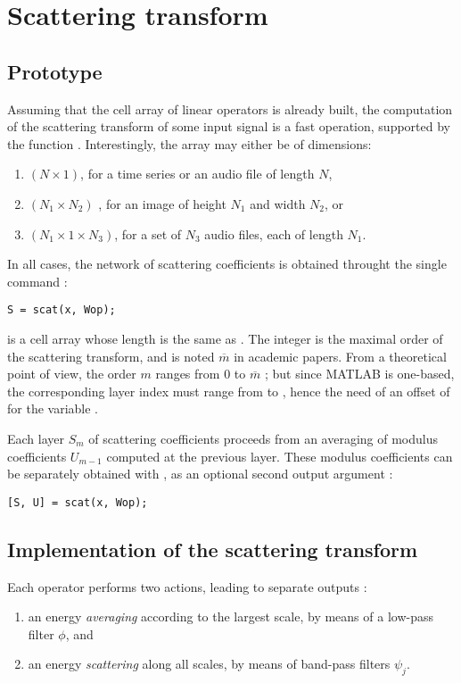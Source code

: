 \documentclass{article}
\begin{document}
\section{Scattering transform \label{sec:scattering-transform}}

\subsection{Prototype \label{sub:scattering-transform-prototype}}
Assuming that the cell array of linear operators  is already built, the computation of the scattering transform of some input signal  is a fast operation, supported by the function .
Interestingly, the array  may either be of dimensions:

\begin{enumerate}
\item $(N \times 1)$, for a time series or an audio file of length $N$,
\item $(N_1 \times N_2)$ , for an image of height $N_1$ and width $N_2$, or
\item $(N_1 \times 1 \times N_3)$, for a set of $N_3$ audio files, each of length $N_1$.
\end{enumerate}

In all cases, the network of scattering coefficients is obtained throught the single command :

\begin{lstlisting}
S = scat(x, Wop);
\end{lstlisting}

 is a cell array whose length  is the same as . The integer  is the maximal order of the scattering transform, and is noted $\overline{m}$ in academic papers. From a theoretical point of view, the order $m$ ranges from $0$ to $\overline{m}$ ; but since MATLAB is one-based, the corresponding layer index must range from  to , hence the need of an offset of  for the variable .

Each layer $S_m$ of scattering coefficients proceeds from an averaging of modulus coefficients $U_{m-1}$ computed at the previous layer. These modulus coefficients can be separately obtained with , as an optional second output argument :

\begin{lstlisting}
[S, U] = scat(x, Wop);
\end{lstlisting}

\subsection{Implementation of the scattering transform}
Each operator  performs two actions, leading to separate outputs :
\begin{enumerate}
\item an energy \emph{averaging} according to the largest scale, by means of a low-pass filter $\phi$, and
\item an energy \emph{scattering} along all scales, by means of band-pass filters $\psi_j$.
\end{enumerate}
\end{document}
